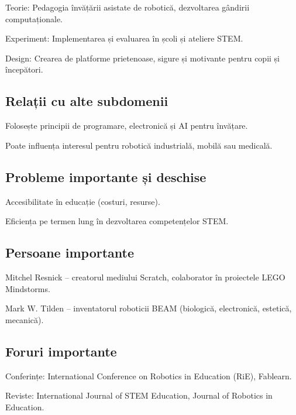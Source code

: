\documentclass[12pt]{article}
\begin{document}
Teorie:
Pedagogia învățării asistate de robotică, dezvoltarea gândirii computaționale.

Experiment:
Implementarea și evaluarea în școli și ateliere STEM.

Design:
Crearea de platforme prietenoase, sigure și motivante pentru copii și începători.

\subsection*{Relații cu alte subdomenii}

Folosește principii de programare, electronică și AI pentru învățare.

Poate influența interesul pentru robotică industrială, mobilă sau medicală.

\subsection*{Probleme importante și deschise}

Accesibilitate în educație (costuri, resurse).

Eficiența pe termen lung în dezvoltarea competențelor STEM.

\subsection*{Persoane importante}

Mitchel Resnick – creatorul mediului Scratch, colaborator în proiectele LEGO Mindstorms.

Mark W. Tilden – inventatorul roboticii BEAM (biologică, electronică, estetică, mecanică).

\subsection*{Foruri importante}

Conferințe: International Conference on Robotics in Education (RiE), Fablearn.

Reviste: International Journal of STEM Education, Journal of Robotics in Education.
\end{document}
